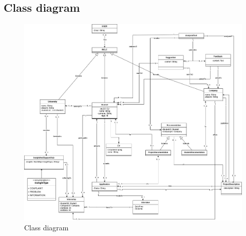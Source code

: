\subsection{Class diagram}
\begin{figure}[H]
    \centering
    \includegraphics[width=1\linewidth]{RASD//Images/UML.drawio.png}
    \caption{Class diagram}
\end{figure}

\pagebreak
